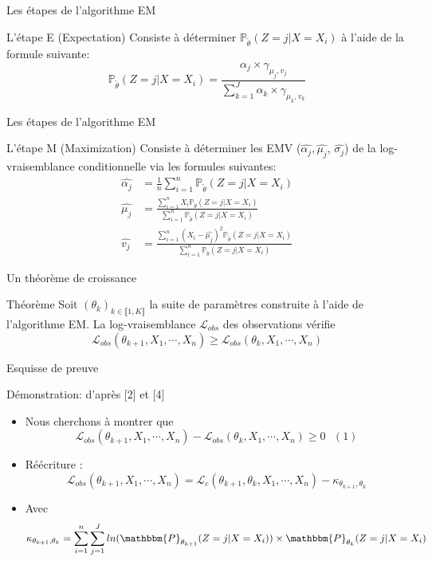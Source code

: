 \documentclass[11pt]{beamer}
\begin{document}
	\begin{frame}{Les étapes de l'algorithme EM}
		\begin{block}{L'étape E (Expectation)}
			Consiste à déterminer $\mathbb{P}_{\tilde{\theta}}(Z = j | X = X_i)$ à l'aide de la formule suivante:
			\[
				\mathbb{P}_{\tilde{\theta}}(Z = j| X = X_i) = \frac{\alpha_j \times \gamma_{\mu_j, v_j}}{\sum_{k=1}^{J} \alpha_k \times \gamma_{\mu_k, v_k}}
			\]
		\end{block}
	\end{frame}
	\begin{frame}{Les étapes de l'algorithme EM}
		\begin{block}{L'étape M (Maximization)}
			Consiste à déterminer les EMV ($\widehat{\alpha_j}, \widehat{\mu_j}$, $\widehat{\sigma_j}$) de la log-vraisemblance conditionnelle via les formules suivantes:
			\begin{align*}
				\widehat{\alpha_j} &= \frac{1}{n}\sum_{i=1}^n \mathbb{P}_{\tilde{\theta}}(Z = j| X = X_i) \\
				\widehat{\mu_j} &= \frac{\sum_{i=1}^n X_i\mathbb{P}_{\tilde{\theta}}(Z = j| X = X_i)}{\sum_{i=1}^n \mathbb{P}_{\tilde{\theta}}(Z = j| X = X_i)} \\
				\widehat{v_j} &= \frac{\sum_{i=1}^n (X_i -\widehat{\mu_j})^2 \mathbb{P}_{\tilde{\theta}}(Z = j| X = X_i)}{\sum_{i=1}^n\mathbb{P}_{\tilde{\theta}}(Z = j| X = X_i)}
			\end{align*}
		\end{block}
	\end{frame}

	\begin{frame}{Un théorème de croissance}
		\begin{block}{Théorème}
			Soit $(\theta_k)_{k\in \llbracket1, K\rrbracket}$ la suite de paramètres construite à l'aide de l'algorithme EM. \newline
La log-vraisemblance $\mathcal{L}_{obs}$ des observations vérifie 
		\[
		\mathcal{L}_{obs}(\theta_{k+1}, X_1, \cdots, X_n) \geq \mathcal{L}_{obs}(\theta_k, X_1, \cdots, X_n)
		\]
		\end{block}
	\end{frame}

	\begin{frame}{Esquisse de preuve}
		\begin{block}{Démonstration: d'après [2] et [4]}
			\scriptsize
			\begin{itemize}
				\item Nous cherchons à montrer que
				\[
				\mathcal{L}_{obs}(\theta_{k+1}, X_1, \cdots, X_n) - \mathcal{L}_{obs}(\theta_k, X_1, \cdots, X_n) \geq 0 \text{   }(1)
				\]
				\item Réécriture :
				\[
				 \mathcal{L}_{obs}(\theta_{k+1}, X_1, \cdots, X_n) = 
				\mathcal{L}_c(\theta_{k+1}, \theta_k, X_1, \cdots, X_n) - \kappa_{\theta_{k+1},\theta_k}
				\]
				\item Avec
					\[
					 \kappa_{\theta_{k+1},\theta_k} = \sum_{i=1}^n\sum_{j=1}^J ln(\mathbbm{P}_{\theta_{k+1}}(Z = j|X=X_i))\times\mathbbm{P}_{\theta_k}(Z = j|X = X_i)
					\]
			\end{itemize}	
		\end{block}
	\end{frame}
\end{document}

